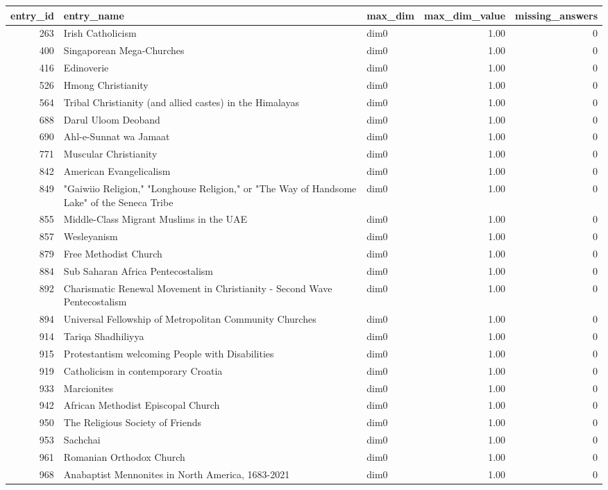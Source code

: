 \begin{tabular}{rllrr}
\toprule
entry_id & entry_name & max_dim & max_dim_value & missing_answers \\
\midrule
263 & Irish Catholicism & dim0 & 1.00 & 0 \\
400 & Singaporean Mega-Churches & dim0 & 1.00 & 0 \\
416 & Edinoverie & dim0 & 1.00 & 0 \\
526 & Hmong Christianity & dim0 & 1.00 & 0 \\
564 & Tribal Christianity (and allied castes) in the Himalayas & dim0 & 1.00 & 0 \\
688 & Darul Uloom Deoband & dim0 & 1.00 & 0 \\
690 & Ahl-e-Sunnat wa Jamaat & dim0 & 1.00 & 0 \\
771 & Muscular Christianity & dim0 & 1.00 & 0 \\
842 & American Evangelicalism & dim0 & 1.00 & 0 \\
849 & "Gaiwiio Religion," "Longhouse Religion," or "The Way of Handsome Lake" of the Seneca Tribe & dim0 & 1.00 & 0 \\
855 & Middle-Class Migrant Muslims in the UAE & dim0 & 1.00 & 0 \\
857 & Wesleyanism & dim0 & 1.00 & 0 \\
879 & Free Methodist Church & dim0 & 1.00 & 0 \\
884 & Sub Saharan Africa Pentecostalism & dim0 & 1.00 & 0 \\
892 & Charismatic Renewal Movement in Christianity - Second Wave Pentecostalism & dim0 & 1.00 & 0 \\
894 & Universal Fellowship of Metropolitan Community Churches & dim0 & 1.00 & 0 \\
914 & Tariqa Shadhiliyya & dim0 & 1.00 & 0 \\
915 & Protestantism welcoming People with Disabilities & dim0 & 1.00 & 0 \\
919 & Catholicism in contemporary Croatia & dim0 & 1.00 & 0 \\
933 & Marcionites & dim0 & 1.00 & 0 \\
942 & African Methodist Episcopal Church & dim0 & 1.00 & 0 \\
950 & The Religious Society of Friends & dim0 & 1.00 & 0 \\
953 & Sachchai & dim0 & 1.00 & 0 \\
961 & Romanian Orthodox Church & dim0 & 1.00 & 0 \\
968 & Anabaptist Mennonites in North America, 1683-2021 & dim0 & 1.00 & 0 \\

\end{tabular}
